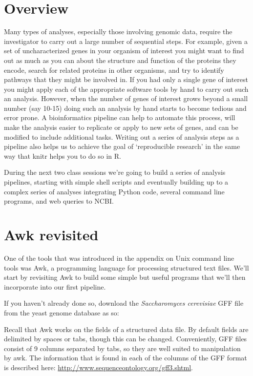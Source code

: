 \section{Overview}

Many types of analyses, especially those involving genomic data, require the investigator to carry out a large number of sequential steps. For example, given a set of uncharacterized genes in your organism of interest you might want to find out as much as you can about the structure and function of the proteins they encode, search for related proteins in other organisms, and try to identify pathways that they might be involved in. If you had only a single gene of interest you might apply each of the appropriate software tools by hand to carry out such an analysis. However, when the number of genes of interest grows beyond a small number (say 10-15) doing such an analysis by hand starts to become tedious and error prone.  A bioinformatics pipeline can help to automate this process, will make the analysis easier to replicate or apply to new sets of genes, and can be modified to include additional tasks.  Writing out a series of analysis steps as a pipeline also helps us to achieve the goal of `reproducible research' in the same way that knitr helps you to do so in R.

During the next two class sessions we're going to build a series of analysis pipelines, starting with simple shell scripts and eventually building up to a complex series of analyses integrating Python code, several command line programs, and web queries to NCBI.


\section{Awk revisited}

One of the tools that was introduced in the appendix on Unix command line tools was Awk, a programming language for processing structured text files.  We'll start by revisiting Awk to build some simple but useful programs that we'll then incorporate into our first pipeline.

If you haven't already done so, download the \textit{Saccharomyces cerevisiae} GFF file from the yeast genome database as so:
%
%
Recall that Awk works on the fields of a structured data file. By default fields are delimited by spaces or tabs, though this can be changed.  Conveniently, GFF files consist of 9 columns separated by tabs, so they are well suited to manipulation by awk.  The information that is found in each of the columns of the GFF format is described here: \url{http://www.sequenceontology.org/gff3.shtml}.

